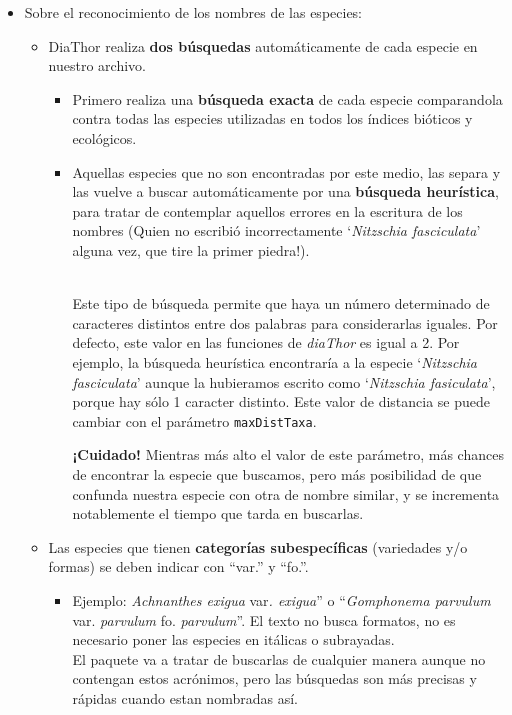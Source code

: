 \documentclass[
]{book}
\providecommand{\tightlist}{%
  \setlength{\itemsep}{0pt}\setlength{\parskip}{0pt}}
\begin{document}
\begin{itemize}
\item
  Sobre el reconocimiento de los nombres de las especies:

  \begin{itemize}
  \item
    DiaThor realiza \textbf{dos búsquedas} automáticamente de cada especie en nuestro archivo.

    \begin{itemize}
    \item
      Primero realiza una \textbf{búsqueda exacta} de cada especie comparandola contra todas las especies utilizadas en todos los índices bióticos y ecológicos.
    \item
      Aquellas especies que no son encontradas por este medio, las separa y las vuelve a buscar automáticamente por una \textbf{búsqueda heurística}, para tratar de contemplar aquellos errores en la escritura de los nombres (Quien no escribió incorrectamente `\emph{Nitzschia fasciculata}' alguna vez, que tire la primer piedra!).\\
      \strut \\
      Este tipo de búsqueda permite que haya un número determinado de caracteres distintos entre dos palabras para considerarlas iguales. Por defecto, este valor en las funciones de \emph{diaThor} es igual a 2. Por ejemplo, la búsqueda heurística encontraría a la especie `\emph{Nitzschia fasciculata}' aunque la hubieramos escrito como `\emph{Nitzschia fasiculata}', porque hay sólo 1 caracter distinto. Este valor de distancia se puede cambiar con el parámetro \texttt{maxDistTaxa}.

      \textbf{¡Cuidado!} Mientras más alto el valor de este parámetro, más chances de encontrar la especie que buscamos, pero más posibilidad de que confunda nuestra especie con otra de nombre similar, y se incrementa notablemente el tiempo que tarda en buscarlas.
    \end{itemize}
  \item
    Las especies que tienen \textbf{categorías subespecíficas} (variedades y/o formas) se deben indicar con ``var.'' y ``fo.''.

    \begin{itemize}
    \tightlist
    \item
      Ejemplo: \emph{Achnanthes exigua} var\emph{. exigua}'' o ``\emph{Gomphonema parvulum} var. \emph{parvulum} fo. \emph{parvulum}''. El texto no busca formatos, no es necesario poner las especies en itálicas o subrayadas.\\
      El paquete va a tratar de buscarlas de cualquier manera aunque no contengan estos acrónimos, pero las búsquedas son más precisas y rápidas cuando estan nombradas así.
    \end{itemize}
  \end{itemize}


\end{itemize}
\end{document}
